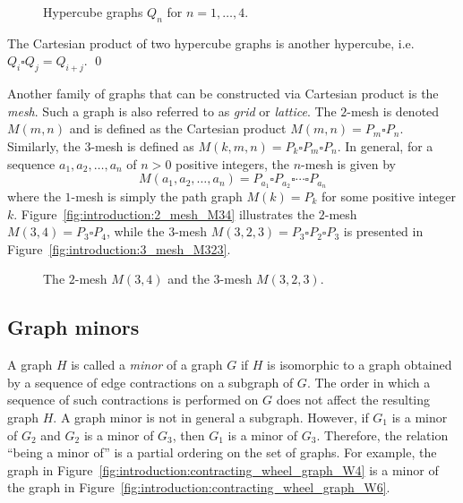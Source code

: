 \begin{figure}[!htbp]
\centering
{}

\caption{Hypercube graphs $Q_n$ for $n = 1,\dots,4$.}
\label{fig:introduction:hypercube_graphs}
\end{figure}

\begin{example}
\rm
The Cartesian product of two hypercube graphs is another
hypercube, i.e. $Q_i \square Q_j = Q_{i+j}$. \qed
\end{example}

Another family of graphs that can be constructed via Cartesian product
is the \emph{mesh}. Such a graph is also referred to as
\emph{grid} or \emph{lattice}. The $2$-mesh
is denoted $M(m,n)$ and is defined as the Cartesian product
$M(m,n) = P_m \square P_n$. Similarly, the $3$-mesh is defined as
$M(k,m,n) = P_k \square P_m \square P_n$. In general, for a sequence
$a_1, a_2, \dots, a_n$ of $n > 0$ positive integers, the $n$-mesh is
given by
\[
M(a_1, a_2, \dots, a_n)
=
P_{a_1} \square P_{a_2} \square \cdots \square P_{a_n}
\]
where the $1$-mesh is simply the path graph $M(k) = P_k$ for some
positive integer $k$. Figure~\ref{fig:introduction:2_mesh_M34}
illustrates the $2$-mesh $M(3,4) = P_3 \square P_4$, while the
$3$-mesh $M(3,2,3) = P_3 \square P_2 \square P_3$ is presented in
Figure~\ref{fig:introduction:3_mesh_M323}.

\begin{figure}[!htbp]
\centering
{}

\caption{The $2$-mesh $M(3, 4)$ and the $3$-mesh $M(3, 2, 3)$.}
\label{fig:introduction:mesh_grid_lattice}
\end{figure}



\subsection{Graph minors}

A graph $H$ is called a \emph{minor} of a graph $G$
if $H$ is isomorphic to a graph obtained by a sequence of edge
contractions on a subgraph of $G$.  The order in which a sequence of
such contractions is performed on $G$ does not affect the resulting
graph $H$. A graph minor is not in general a subgraph. However, if
$G_1$ is a minor of $G_2$ and $G_2$ is a minor of $G_3$, then $G_1$ is
a minor of $G_3$. Therefore, the relation ``being a minor of'' is a
partial ordering on the set of graphs. For example, the graph in
Figure~\ref{fig:introduction:contracting_wheel_graph_W4} is a minor of
the graph in Figure~\ref{fig:introduction:contracting_wheel_graph_W6}.

